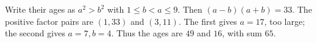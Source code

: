 Write their ages as $a^2>b^2$ with $1\le b<a\le9$. Then $(a-b)(a+b)=33$. The positive factor pairs are $(1,33)$ and $(3,11)$. The first gives $a=17$, too large; the second gives $a=7,b=4$. Thus the ages are $49$ and $16$, with sum $\boxed{65}$.
